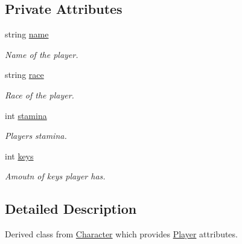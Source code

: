 \subsection*{Private Attributes}
\begin{DoxyCompactItemize}
\item 
string \hyperlink{classPlayer_acf0355128a99ee20ad9931b760fb2de1}{name}
\begin{DoxyCompactList}\small\item\em Name of the player. \end{DoxyCompactList}\item 
string \hyperlink{classPlayer_a5130cb6c4233cd7ad1212af0d1790e58}{race}
\begin{DoxyCompactList}\small\item\em Race of the player. \end{DoxyCompactList}\item 
int \hyperlink{classPlayer_a3642fc1d242a769a2ea76dc0b1662a20}{stamina}
\begin{DoxyCompactList}\small\item\em Players stamina. \end{DoxyCompactList}\item 
int \hyperlink{classPlayer_ac46baa685ca2a266178f03b9e9877e65}{keys}
\begin{DoxyCompactList}\small\item\em Amoutn of keys player has. \end{DoxyCompactList}\end{DoxyCompactItemize}


\subsection{Detailed Description}
Derived class from \hyperlink{classCharacter}{Character} which provides \hyperlink{classPlayer}{Player} attributes. 

